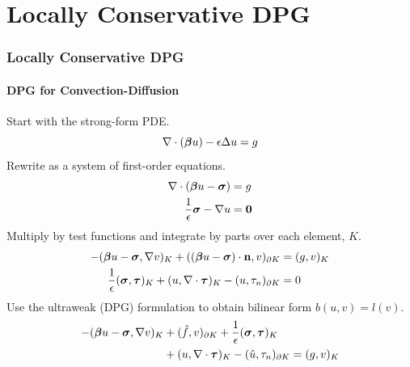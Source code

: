 \documentclass[18pt,xcolor=table]{beamer}
\begin{document}




%                      
%                      
%      
\section{Locally Conservative DPG}
\begin{frame}
\frametitle{Locally Conservative DPG}
\framesubtitle{DPG for Convection-Diffusion}
Start with the strong-form PDE.
\[
\nabla\cdot(\boldsymbol\beta u)-\epsilon\Delta u = g
\]
Rewrite as a system of first-order equations.
\begin{align*}
\nabla\cdot(\boldsymbol\beta u-\boldsymbol\sigma)&=g\\
\frac{1}{\epsilon}\boldsymbol\sigma-\nabla u&=\boldsymbol0
\end{align*}
Multiply by test functions and integrate by parts over each element, $K$.
\begin{align*}
-(\boldsymbol\beta u-\boldsymbol\sigma,\nabla v)_K+((\boldsymbol\beta
u-\boldsymbol\sigma)\cdot\mathbf{n},v)_{\partial K}&=(g,v)_K\\
\frac{1}{\epsilon}(\boldsymbol\sigma,\boldsymbol\tau)_K+(u,\nabla\cdot\boldsymbol\tau)_K
-(u,\tau_n)_{\partial K}&=0
\end{align*}
Use the ultraweak (DPG) formulation to obtain bilinear form $b(u,v)=l(v)$.
\begin{align*}
-(\boldsymbol\beta u-\boldsymbol\sigma,\nabla v)_K&+(\hat f,v)_{\partial K}
+ \frac{1}{\epsilon}(\boldsymbol\sigma,\boldsymbol\tau)_K\\
&+(u,\nabla\cdot\boldsymbol\tau)_K
-(\hat u,\tau_n)_{\partial K}=(g,v)_K
\end{align*}
\end{frame}
\end{document}
